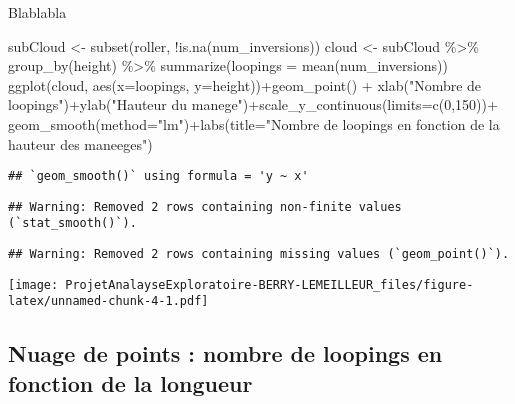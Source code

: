 \documentclass[
]{article}
\newenvironment{Shaded}{\begin{snugshade}}{\end{snugshade}}
\newcommand{\AttributeTok}[1]{\textcolor[rgb]{0.77,0.63,0.00}{#1}}
\newcommand{\DecValTok}[1]{\textcolor[rgb]{0.00,0.00,0.81}{#1}}
\newcommand{\FunctionTok}[1]{\textcolor[rgb]{0.00,0.00,0.00}{#1}}
\newcommand{\NormalTok}[1]{#1}
\newcommand{\OtherTok}[1]{\textcolor[rgb]{0.56,0.35,0.01}{#1}}
\newcommand{\SpecialCharTok}[1]{\textcolor[rgb]{0.00,0.00,0.00}{#1}}
\newcommand{\StringTok}[1]{\textcolor[rgb]{0.31,0.60,0.02}{#1}}
\begin{document}
Blablabla

\begin{Shaded}
\begin{Highlighting}[]
\NormalTok{subCloud }\OtherTok{\textless{}{-}} \FunctionTok{subset}\NormalTok{(roller, }\SpecialCharTok{!}\FunctionTok{is.na}\NormalTok{(num\_inversions))}
\NormalTok{cloud }\OtherTok{\textless{}{-}}\NormalTok{ subCloud }\SpecialCharTok{\%\textgreater{}\%} \FunctionTok{group\_by}\NormalTok{(height) }\SpecialCharTok{\%\textgreater{}\%} 
  \FunctionTok{summarize}\NormalTok{(}\AttributeTok{loopings =} \FunctionTok{mean}\NormalTok{(num\_inversions))}
\FunctionTok{ggplot}\NormalTok{(cloud, }\FunctionTok{aes}\NormalTok{(}\AttributeTok{x=}\NormalTok{loopings, }\AttributeTok{y=}\NormalTok{height))}\SpecialCharTok{+}\FunctionTok{geom\_point}\NormalTok{() }\SpecialCharTok{+} \FunctionTok{xlab}\NormalTok{(}\StringTok{"Nombre de loopings"}\NormalTok{)}\SpecialCharTok{+}\FunctionTok{ylab}\NormalTok{(}\StringTok{"Hauteur du manege"}\NormalTok{)}\SpecialCharTok{+}\FunctionTok{scale\_y\_continuous}\NormalTok{(}\AttributeTok{limits=}\FunctionTok{c}\NormalTok{(}\DecValTok{0}\NormalTok{,}\DecValTok{150}\NormalTok{))}\SpecialCharTok{+} \FunctionTok{geom\_smooth}\NormalTok{(}\AttributeTok{method=}\StringTok{"lm"}\NormalTok{)}\SpecialCharTok{+}\FunctionTok{labs}\NormalTok{(}\AttributeTok{title=}\StringTok{"Nombre de loopings en fonction de la hauteur des maneeges"}\NormalTok{)}
\end{Highlighting}
\end{Shaded}

\begin{verbatim}
## `geom_smooth()` using formula = 'y ~ x'
\end{verbatim}

\begin{verbatim}
## Warning: Removed 2 rows containing non-finite values (`stat_smooth()`).
\end{verbatim}

\begin{verbatim}
## Warning: Removed 2 rows containing missing values (`geom_point()`).
\end{verbatim}

\texttt{[image: ProjetAnalayseExploratoire-BERRY-LEMEILLEUR\_files/figure-latex/unnamed-chunk-4-1.pdf]}

\hypertarget{nuage-de-points-nombre-de-loopings-en-fonction-de-la-longueur}{%
\subsection{Nuage de points : nombre de loopings en fonction de la
longueur}\label{nuage-de-points-nombre-de-loopings-en-fonction-de-la-longueur}}
\end{document}
